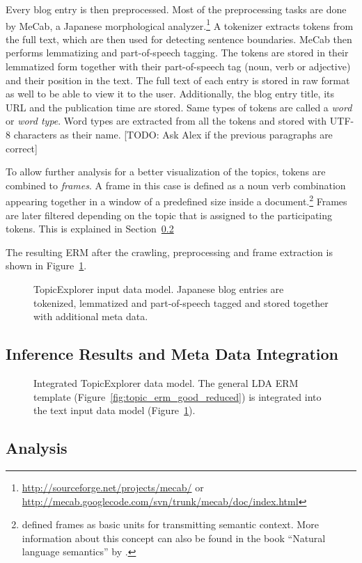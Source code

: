 Every blog entry is then preprocessed. Most of the preprocessing tasks are done by MeCab, a Japanese morphological analyzer.\footnote{\url{http://sourceforge.net/projects/mecab/} or \url{http://mecab.googlecode.com/svn/trunk/mecab/doc/index.html}} A tokenizer extracts tokens from the full text, which are then used for detecting sentence boundaries. MeCab then performs lemmatizing and part-of-speech tagging. The tokens are stored in their lemmatized form together with their part-of-speech tag (noun, verb or adjective) and their position in the text. The full text of each entry is stored in raw format as well to be able to view it to the user. Additionally, the blog entry title, its URL and the publication time are stored. Same types of tokens are called a \emph{word} or \emph{word type}. Word types are extracted from all the tokens and stored with UTF-8 characters as their name. [TODO: Ask Alex if the previous paragraphs are correct]

To allow further analysis for a better visualization of the topics, tokens are combined to \emph{frames}. A frame in this case is defined as a noun verb combination appearing together in a window of a predefined size inside a document.\footnote{\textcite{minsky1977frame} defined frames as basic units for transmitting semantic context. More information about this concept can also be found in the book ``Natural language semantics'' by \textcite{allan2001natural}.} Frames are later filtered depending on the topic that is assigned to the participating tokens. This is explained in Section~\ref{subsec:casestudy_analysis}

The resulting ERM after the crawling, preprocessing and frame extraction is shown in Figure~\ref{fig:TopicExplorer_data_erm}.

\begin{figure}
\centering
\scalebox{\tikzScale}{\adjustTikzSize }
\caption[TopicExplorer input data model]{TopicExplorer input data model. Japanese blog entries are tokenized, lemmatized and part-of-speech tagged and stored together with additional meta data.}\label{fig:TopicExplorer_data_erm}
\end{figure}

\subsection{Inference Results and Meta Data Integration}

\begin{figure}
\centering
\scalebox{0.7}{\adjustTikzSize }
\caption[TopicExplorer input data model]{Integrated TopicExplorer data model. The general LDA ERM template (Figure~\ref{fig:topic_erm_good_reduced}) is integrated into the text input data model (Figure~\ref{fig:TopicExplorer_data_erm}).}\label{fig:TopicExplorer_integrated_erm}
\end{figure}

\subsection{Analysis}
\label{subsec:casestudy_analysis}
